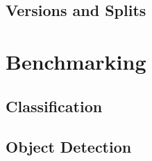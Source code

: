 \subsection{Versions and Splits}





\begin{figure}[htb!]
	
	\caption{}
	\label{fig:hypernym_distribution}
\end{figure}



\iffalse
\begin{figure}[htb!]
	
	\caption{}
	\label{fig:hypernym_distribution}
\end{figure}
\fi



\section{Benchmarking}
\label{sec:benchmarking}

\subsection{Classification}
\subsection{Object Detection}


\iffalse
\begin{figure}[htb!]
	\scalebox{0.8}{}
	\caption{}
	\label{fig:detection_experiment_1}
\end{figure}


\begin{figure}[htb!]
	\scalebox{0.8}{}
	\caption{}
	\label{fig:detection_experiment_2}
\end{figure}


\begin{figure}[htb!]
	\scalebox{0.8}{}
	\caption{}
	\label{fig:detection_experiment_4}
\end{figure}


\begin{figure}[htb!]
	\scalebox{0.8}{}
	\caption{}
	\label{fig:detection_experiment_4}
\end{figure}
\fi



